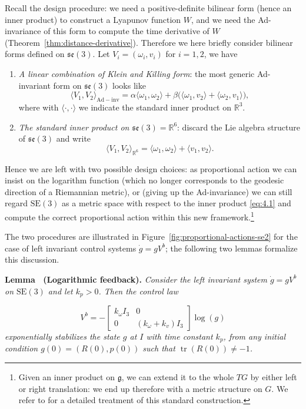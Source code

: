 \documentclass[11pt]{article}
\newcommand{\SE}{\mathrm{SE}}
\newcommand{\se}{\mathfrak{se}}
\newcommand{\gfrak}{\mathfrak g}
\newcommand{\tr}{\operatorname{tr}}
\newcommand{\R}{\mathbb R}
\newcounter{paperlemma}
\renewcommand{\thepaperlemma}{\arabic{paperlemma}}
\newcommand{\paperlemma}[3]{\refstepcounter{paperlemma}\par\medskip\noindent\textbf{Lemma \thepaperlemma\ (#1).}\label{#2} \textit{#3}\par}
\begin{document}
Recall the design procedure: we need a positive-definite bilinear form (hence an inner product) to construct a Lyapunov function $W$, and we need the Ad-invariance of this form to compute the time derivative of $W$ (Theorem~\ref{thm:distance-derivative}). Therefore we here briefly consider bilinear forms defined on $\se(3)$. Let $V_i=(\omega_i,v_i)$ for $i=1,2$, we have
\begin{enumerate}[label=\arabic*.]
\item \emph{A linear combination of Klein and Killing form}: the most generic Ad-invariant form on $\se(3)$ looks like
\begin{equation*}
\langle V_1,V_2\rangle_{\mathrm{Ad-inv}}=\alpha\langle\omega_1,\omega_2\rangle+\beta\bigl(\langle\omega_1,v_2\rangle+\langle\omega_2,v_1\rangle\bigr),
\end{equation*}
where with $\langle\cdot,\cdot\rangle$ we indicate the standard inner product on $\R^3$.
\item \emph{The standard inner product on $\se(3)=\R^6$}: discard the Lie algebra structure of $\se(3)$ and write
\begin{equation*}
\langle V_1,V_2\rangle_{\R^6}=\langle\omega_1,\omega_2\rangle+\langle v_1,v_2\rangle.\tag{4.1}\label{eq:4.1}
\end{equation*}
\end{enumerate}
Hence we are left with two possible design choices: as proportional action we can insist on the logarithm function (which no longer corresponds to the geodesic direction of a Riemannian metric), or (giving up the Ad-invariance) we can still regard $\SE(3)$ as a metric space with respect to the inner product \eqref{eq:4.1} and compute the correct proportional action within this new framework.\footnote{Given an inner product on $\gfrak$, we can extend it to the whole $TG$ by either left or right translation: we end up therefore with a metric structure on $G$. We refer to \cite{4} for a detailed treatment of this standard construction.}

The two procedures are illustrated in Figure~\ref{fig:proportional-actions-se2} for the case of left invariant control systems $\dot g=gV^b$; the following two lemmas formalize this discussion.

\paperlemma{Logarithmic feedback}{lem:log-feedback-se3}{Consider the left invariant system $\dot g=gV^b$ on $\SE(3)$ and let $k_p>0$. Then the control law}
\begin{equation*}
V^b=-\begin{bmatrix}k_\omega I_3&0\\0&(k_\omega+k_v)I_3\end{bmatrix}\log(g)\tag{4.2}\label{eq:4.2}
\end{equation*}
\emph{exponentially stabilizes the state $g$ at $I$ with time constant $k_p$, from any initial condition $g(0)=(R(0),p(0))$ such that $\tr(R(0))\neq-1$.}
\end{document}
